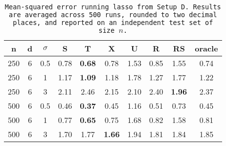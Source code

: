 \begin{table}[ht]
\centering
\begin{tabular}{cccccccccc}
  \hline
n & d & $\sigma$ & S & T & X & U & R & RS & oracle \\ 
  \hline
250 & 6 & 0.5 & 0.78 & \bf 0.68 & 0.78 & 1.53 & 0.85 & 1.55 & 0.74 \\ 
  250 & 6 & 1 & 1.17 & \bf 1.09 & 1.18 & 1.78 & 1.27 & 1.77 & 1.22 \\ 
  250 & 6 & 3 & 2.11 & 2.46 & 2.15 & 2.10 & 2.40 & \bf 1.96 & 2.37 \\ 
  500 & 6 & 0.5 & 0.46 & \bf 0.37 & 0.45 & 1.16 & 0.51 & 0.73 & 0.45 \\ 
  500 & 6 & 1 & 0.77 & \bf 0.65 & 0.75 & 1.68 & 0.82 & 1.58 & 0.81 \\ 
  500 & 6 & 3 & 1.70 & 1.77 & \bf 1.66 & 1.94 & 1.81 & 1.84 & 1.85 \\ 
   \hline
\end{tabular}
\caption{\tt Mean-squared error running \texttt{lasso} from Setup D. Results are averaged across 500 runs, rounded to two decimal places, and reported on an independent test set of size $n$.} 
\label{table:setup4}
\end{table}
